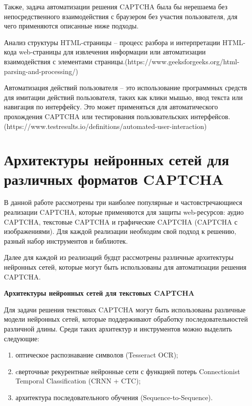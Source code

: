 Также, задача автоматизации решения CAPTCHA была бы нерешаема без 
непосредственного взаимодействия с браузером без участия пользователя, для чего 
применяются описанные ниже подходы.

Анализ структуры HTML-страницы -- процесс разбора и интерпретации HTML-кода 
web-страницы для извлечения информации или автоматизации взаимодействия с 
элементами страницы.(https://www.geeksforgeeks.org/html-parsing-and-processing/)

Автоматизация действий пользователя -- это использование программных средств для 
имитации действий пользователя, таких как клики мышью, ввод текста или навигация 
по интерфейсу. Это может применяться для автоматического прохождения CAPTCHA или 
тестирования пользовательских интерфейсов.(https://www.testresults.io/definitions/automated-user-interaction)

\section{Архитектуры нейронных сетей для различных форматов CAPTCHA}

В данной работе рассмотрены три наиболее популярные и частовстречающиеся 
реализации CAPTCHA, которые применяются для защиты web-ресурсов: аудио CAPTCHA, 
текстовые CAPTCHA и графические CAPTCHA (CAPTCHA с изображениями). Для каждой 
реализации необходим свой подход к решению, разный набор инструментов и библиотек.

Далее для каждой из реализаций будцт рассмотрены различные архитектуры нейронных 
сетей, которые могут быть использованы для автоматизации решения CAPTCHA.

\textbf{Архитектуры нейронных сетей для текстовых CAPTCHA}

Для задачи решения текстовых CAPTCHA могут быть использованы различные модели 
нейронных сетей, которые поддерживают обработку последовательностей различной 
длины. Среди таких архитектур и инструментов можно выделить следующие:

\begin{enumerate}
    \item оптическое распознавание символов (Tesseract OCR);
    \item cверточные рекурентные нейронные сети с функцией потерь Connectionist 
    Temporal Classification (CRNN + CTC);
    \item архитектура последовательного обучения (Sequence-to-Sequence).
\end{enumerate}

